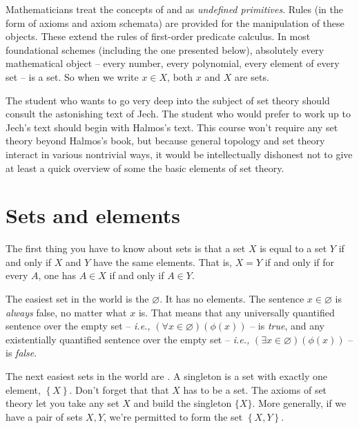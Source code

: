 
Mathematicians treat the concepts of  and  as \emph{undefined primitives}.
Rules (in the form of axioms and axiom schemata) are provided for the manipulation of these objects.
These extend the rules of first-order predicate calculus. In most foundational schemes (including the one presented below), absolutely every mathematical object -- every number, every polynomial, every element of every set -- is a set.
So when we write $x\in X$, both $x$ and $X$ are sets.

The student who wants to go very deep into the subject of set theory should consult the astonishing text of Jech\autocite{Jech:2003tt}.
The student who would prefer to work up to Jech's text should begin with Halmos's text\autocite{MR0453532}.%
This course won't require any set theory beyond Halmos's book, but because general topology and set theory interact in various nontrivial ways, it would be intellectually dishonest not to give at least a quick overview of some the basic elements of set theory.

\section{Sets and elements}%
\label{sec:sets_and_elements}

The first thing you have to know about sets is that a set $X$ is equal to a set $Y$ if and only if $X$ and $Y$ have the same elements.
That is, $X=Y$ if and only if for every $A$, one has $A\in X$ if and only if $A\in Y$.

The easiest set in the world is the  $\varnothing$.
It has no elements.
The sentence $x\in\varnothing$ is \emph{always} false, no matter what $x$ is.
That means that any universally quantified sentence over the empty set -- \emph{i.e.,} $(\forall x\in\varnothing)(\phi(x))$ -- is \emph{true}, and
any existentially quantified sentence over the empty set -- \emph{i.e.,} $(\exists x\in\varnothing)(\phi(x))$ -- is \emph{false}.%

The next easiest sets in the world are .
A singleton is a set with exactly one element, $\left\{X\right\}$.
Don't forget that that $X$ has to be a set.
The axioms of set theory let you take any set $X$ and build the singleton $\{X\}$.
More generally, if we have a pair of sets $X,Y$, we're permitted to form the set $\left\{X,Y\right\}$.

